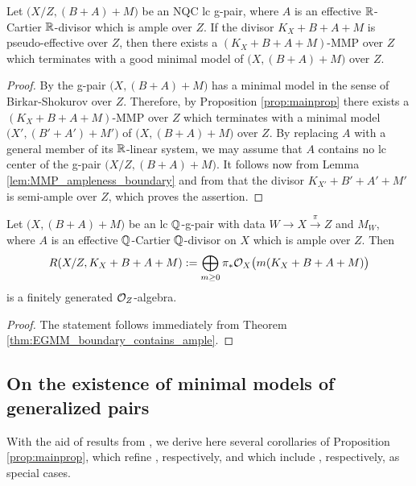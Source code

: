 	\begin{thm}\label{thm:EGMM_boundary_contains_ample}
		Let $ \big( X/Z,(B+A)+M \big) $ be an NQC lc g-pair, where $ A $ is an effective $ \mathbb{R} $-Cartier $\mathbb{R}$-divisor which is ample over $ Z $. If the divisor $K_X+B+A+M$ is pseudo-effective over $Z$, then there exists a $(K_X+B+A+M)$-MMP over $Z$ which terminates with a good minimal model of $ \big( X,(B+A)+M \big) $ over $ Z $.
	\end{thm}
	
	\begin{proof}
		By \cite[Theorem 1.2(1)]{LX22a} the g-pair $\big(X, (B+A) + M \big)$ has a minimal model in the sense of Birkar-Shokurov over $ Z $. Therefore, by Proposition \ref{prop:mainprop} there exists a $ (K_X + B + A + M) $-MMP over $Z$ which terminates with a minimal model $ \big( X',(B'+A')+M' \big) $ of $ \big( X,(B+A)+M \big) $ over $ Z $. By replacing $A$ with a general member of its $\mathbb{R}$-linear system, we may assume that $A$ contains no lc center of the g-pair $ \big(X/Z,(B+A)+M \big)$. It follows now from Lemma \ref{lem:MMP_ampleness_boundary} and from \cite[Theorem 1.2]{Xie22} that the divisor $ K_{X'} + B' + A' + M' $ is semi-ample over $ Z $, which proves the assertion.
	\end{proof}
	
	\begin{cor}\label{cor:finite_generation}
		Let $ \big( X, (B+A)+M \big) $ be an lc $\mathbb{Q}$-g-pair with data $ W \to X \overset{\pi}{\longrightarrow} Z $ and $ M_W $, where $A$ is an effective $\mathbb{Q}$-Cartier $\mathbb{Q}$-divisor on $ X $ which is ample over $Z$. Then 
		\[ R(X/Z,K_X+B+A+M) := \bigoplus_{m \geq 0} \pi_* \mathcal{O}_X \big( m(K_X+B+A+M) \big) \]
		is a finitely generated $ \mathcal{O}_Z $-algebra.
	\end{cor}
	
	\begin{proof}
		The statement follows immediately from Theorem \ref{thm:EGMM_boundary_contains_ample}.
	\end{proof}
	
	
	\subsection{On the existence of minimal models of generalized pairs}
	\label{subsection:EMM}
	
	With the aid of results from \cite[Section 4]{LT22a}, we derive here several corollaries of Proposition \ref{prop:mainprop}, which refine \cite[Corollary 1.3, Theorem 1.5 and Corollary 1.4]{LT22b}, respectively, and which include \cite[Theorem A, Theorem C and Corollary D]{LT22a}, respectively, as special cases.
	
